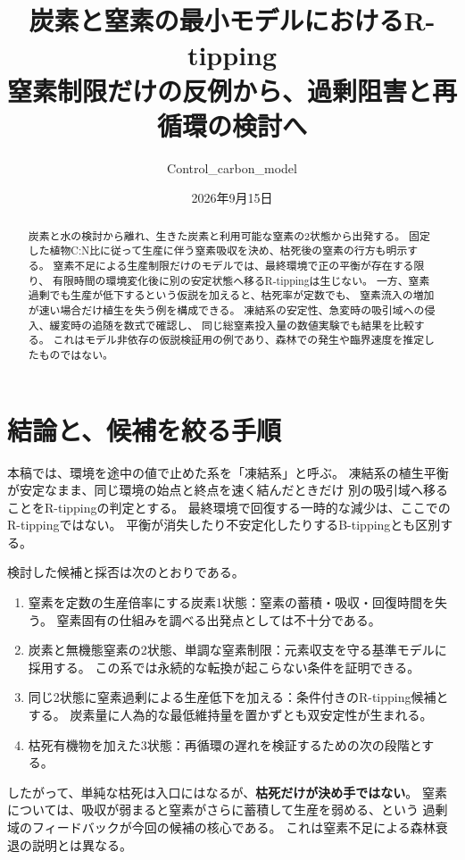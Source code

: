 \documentclass[a4paper,11pt]{ltjsarticle}
\title{炭素と窒素の最小モデルにおけるR-tipping\\
\large 窒素制限だけの反例から、過剰阻害と再循環の検討へ}
\author{Control\_carbon\_model}
\date{2026年9月15日}
\begin{document}
\maketitle
\begin{abstract}
炭素と水の検討から離れ、生きた炭素と利用可能な窒素の2状態から出発する。
固定した植物C:N比に従って生産に伴う窒素吸収を決め、枯死後の窒素の行方も明示する。
窒素不足による生産制限だけのモデルでは、最終環境で正の平衡が存在する限り、
有限時間の環境変化後に別の安定状態へ移るR-tippingは生じない。
一方、窒素過剰でも生産が低下するという仮説を加えると、枯死率が定数でも、
窒素流入の増加が速い場合だけ植生を失う例を構成できる。
凍結系の安定性、急変時の吸引域への侵入、緩変時の追随を数式で確認し、
同じ総窒素投入量の数値実験でも結果を比較する。
これはモデル非依存の仮説検証用の例であり、森林での発生や臨界速度を推定したものではない。
\end{abstract}
\tableofcontents
\clearpage

\section{結論と、候補を絞る手順}
本稿では、環境を途中の値で止めた系を「凍結系」と呼ぶ。
凍結系の植生平衡が安定なまま、同じ環境の始点と終点を速く結んだときだけ
別の吸引域へ移ることをR-tippingの判定とする\cite{ashwin}。
最終環境で回復する一時的な減少は、ここでのR-tippingではない。
平衡が消失したり不安定化したりするB-tippingとも区別する。

検討した候補と採否は次のとおりである。
\begin{enumerate}
\item 窒素を定数の生産倍率にする炭素1状態：窒素の蓄積・吸収・回復時間を失う。
      窒素固有の仕組みを調べる出発点としては不十分である。
\item 炭素と無機態窒素の2状態、単調な窒素制限：元素収支を守る基準モデルに採用する。
      この系では永続的な転換が起こらない条件を証明できる。
\item 同じ2状態に窒素過剰による生産低下を加える：条件付きのR-tipping候補とする。
      炭素量に人為的な最低維持量を置かずとも双安定性が生まれる。
\item 枯死有機物を加えた3状態：再循環の遅れを検証するための次の段階とする。
\end{enumerate}
したがって、単純な枯死は入口にはなるが、\textbf{枯死だけが決め手ではない}。
窒素については、吸収が弱まると窒素がさらに蓄積して生産を弱める、という
過剰域のフィードバックが今回の候補の核心である。
これは窒素不足による森林衰退の説明とは異なる。
\end{document}
